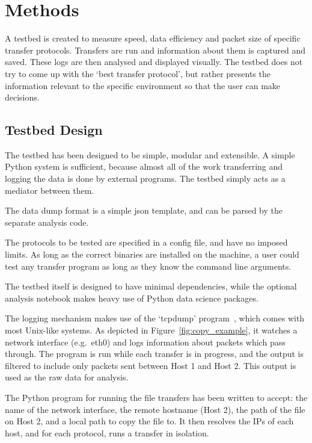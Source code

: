 \documentclass{sig-alternate-05-2015}
\begin{document}
\section{Methods}
A testbed is created to measure speed, data efficiency and packet size of specific transfer protocols. Transfers are run and information about them is captured and saved. These logs are then analysed and displayed visually. The testbed does not try to come up with the `best transfer protocol', but rather presents the information relevant to the specific environment so that the user can make decisions.

\subsection{Testbed Design}
The testbed has been designed to be simple, modular and extensible. A simple Python system is sufficient, because almost all of the work transferring and logging the data is done by external programs. The testbed simply acts as a mediator between them.

The data dump format is a simple json template, and can be parsed by the separate analysis code.

The protocols to be tested are specified in a config file, and have no imposed limits. As long as the correct binaries are installed on the machine, a user could test any transfer program as long as they know the command line arguments.

The testbed itself is designed to have minimal dependencies, while the optional analysis notebook makes heavy use of Python data science packages.

The logging mechanism makes use of the `tcpdump' program~\cite{tcpdump}, which comes with most Unix-like systems. As depicted in Figure~\ref{fig:copy_example}, it watches a network interface (e.g.\ eth0) and logs information about packets which pass through. The program is run while each transfer is in progress, and the output is filtered to include only packets sent between Host 1 and Host 2. This output is used as the raw data for analysis.

The Python program for running the file transfers has been written to accept: the name of the network interface, the remote hostname (Host 2), the path of the file on Host 2, and a local path to copy the file to.
It then resolves the IPs of each host, and for each protocol, runs a transfer in isolation. 
\end{document}
